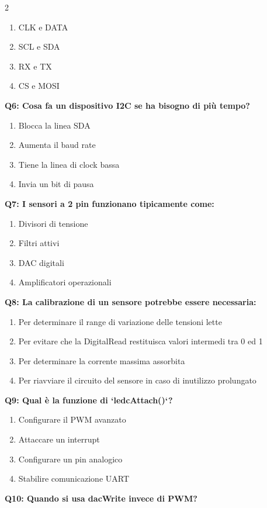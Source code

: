 \documentclass[10pt]{article}
\begin{document}
\begin{multicols}{2}
\begin{enumerate}[label=\arabic*.]
\item CLK e DATA
\item SCL e SDA
\item RX e TX
\item CS e MOSI
\end{enumerate}
\textbf{Q6: Cosa fa un dispositivo I2C se ha bisogno di più tempo?}

\begin{enumerate}[label=\arabic*.]
\item Blocca la linea SDA
\item Aumenta il baud rate
\item Tiene la linea di clock bassa
\item Invia un bit di pausa
\end{enumerate}
\textbf{Q7: I sensori a 2 pin funzionano tipicamente come:}

\begin{enumerate}[label=\arabic*.]
\item Divisori di tensione
\item Filtri attivi
\item DAC digitali
\item Amplificatori operazionali
\end{enumerate}
\textbf{Q8: La calibrazione di un sensore potrebbe essere necessaria:}

\begin{enumerate}[label=\arabic*.]
\item Per determinare il range di variazione delle tensioni lette
\item Per evitare che la DigitalRead restituisca valori intermedi tra 0 ed 1
\item Per determinare la corrente massima assorbita
\item Per riavviare il circuito del sensore in caso di inutilizzo prolungato
\end{enumerate}
\textbf{Q9: Qual è la funzione di `ledcAttach()`?}

\begin{enumerate}[label=\arabic*.]
\item Configurare il PWM avanzato
\item Attaccare un interrupt
\item Configurare un pin analogico
\item Stabilire comunicazione UART
\end{enumerate}
\textbf{Q10: Quando si usa dacWrite invece di PWM?}


\end{multicols}
\end{document}
